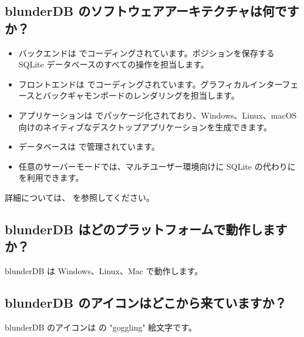 \documentclass[letterpaper,10pt,dvipdfmx]{sphinxmanual}
\begin{document}
\subsection{blunderDB のソフトウェアアーキテクチャは何ですか？}
\label{\detokenize{faq:quel-est-l-architecture-logicielle-de-blunderdb}}\begin{itemize}
\item {} 
\sphinxAtStartPar
バックエンドは  でコーディングされています。ポジションを保存する SQLite データベースのすべての操作を担当します。

\item {} 
\sphinxAtStartPar
フロントエンドは  でコーディングされています。グラフィカルインターフェースとバックギャモンボードのレンダリングを担当します。

\item {} 
\sphinxAtStartPar
アプリケーションは  でパッケージ化されており、Windows、Linux、macOS 向けのネイティブなデスクトップアプリケーションを生成できます。

\item {} 
\sphinxAtStartPar
データベースは  で管理されています。

\item {} 
\sphinxAtStartPar
任意のサーバーモードでは、マルチユーザー環境向けに SQLite の代わりに  を利用できます。

\end{itemize}

\sphinxAtStartPar
詳細については、 を参照してください。


\subsection{blunderDB はどのプラットフォームで動作しますか？}
\label{\detokenize{faq:sur-quelles-plateformes-blunderdb-fonctionne-t-il}}
\sphinxAtStartPar
blunderDB は Windows、Linux、Mac で動作します。


\subsection{blunderDB のアイコンはどこから来ていますか？}
\label{\detokenize{faq:d-ou-vient-l-icone-de-blunderdb}}
\sphinxAtStartPar
blunderDB のアイコンは  の "goggling" 絵文字です。
\end{document}
